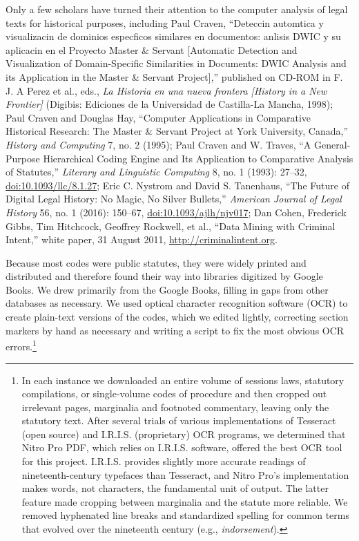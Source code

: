 \documentclass[12pt,]{article}
\let\rmarkdownfootnote\footnote%
\def\footnote{\protect\rmarkdownfootnote}
\begin{document}
{  Only a few scholars have turned their attention to the computer
  analysis of legal texts for historical purposes, including Paul
  Craven, ``Deteccin automtica y visualizacin de dominios especficos
  similares en documentos: anlisis DWIC y su aplicacin en el Proyecto
  Master \& Servant {[}Automatic Detection and Visualization of
  Domain-Specific Similarities in Documents: DWIC Analysis and its
  Application in the Master \& Servant Project{]},'' published on CD-ROM
  in F. J. A Perez et al., eds., \emph{La Historia en una nueva frontera
  {[}History in a New Frontier{]}} (Digibis: Ediciones de la Universidad
  de Castilla-La Mancha, 1998); Paul Craven and Douglas Hay, ``Computer
  Applications in Comparative Historical Research: The Master \& Servant
  Project at York University, Canada,'' \emph{History and Computing} 7,
  no. 2 (1995); Paul Craven and W. Traves, ``A General-Purpose
  Hierarchical Coding Engine and Its Application to Comparative Analysis
  of Statutes,'' \emph{Literary and Linguistic Computing} 8, no. 1
  (1993): 27--32, \url{doi:10.1093/llc/8.1.27}; Eric C. Nystrom and
  David S. Tanenhaus, ``The Future of Digital Legal History: No Magic,
  No Silver Bullets,'' \emph{American Journal of Legal History} 56, no.
  1 (2016): 150--67, \url{doi:10.1093/ajlh/njv017}; Dan Cohen, Frederick
  Gibbs, Tim Hitchcock, Geoffrey Rockwell, et al., ``Data Mining with
  Criminal Intent,'' white paper, 31 August 2011,
  \url{http://criminalintent.org}.}

Because most codes were public statutes, they were widely printed and
distributed and therefore found their way into libraries digitized by
Google Books. We drew primarily from the Google Books, filling in gaps
from other databases as necessary. We used optical character recognition
software (OCR) to create plain-text versions of the codes, which we
edited lightly, correcting section markers by hand as necessary and
writing a script to fix the most obvious OCR errors.\footnote{In each
  instance we downloaded an entire volume of sessions laws, statutory
  compilations, or single-volume codes of procedure and then cropped out
  irrelevant pages, marginalia and footnoted commentary, leaving only
  the statutory text. After several trials of various implementations of
  Tesseract (open source) and I.R.I.S. (proprietary) OCR programs, we
  determined that Nitro Pro PDF, which relies on I.R.I.S. software,
  offered the best OCR tool for this project. I.R.I.S. provides slightly
  more accurate readings of nineteenth-century typefaces than Tesseract,
  and Nitro Pro's implementation makes words, not characters, the
  fundamental unit of output. The latter feature made cropping between
  marginalia and the statute more reliable. We removed hyphenated line
  breaks and standardized spelling for common terms that evolved over
  the nineteenth century (e.g., \emph{indorsement}).}
\end{document}
